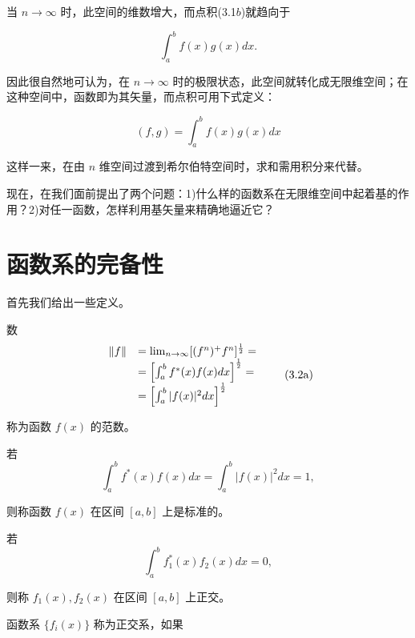 当 $n \to \infty$ 时，此空间的维数增大，而点积(3.1$b$)就趋向于

\begin{equation*}
\int_ {a} ^ {b} f (x) g (x) d x.
\end{equation*}

因此很自然地可认为，在 $n \to \infty$ 时的极限状态，此空间就转化成无限维空间；在这种空间中，函数即为其矢量，而点积可用下式定义：

\begin{equation*}
(f, g) = \int_ {a} ^ {b} f (x) g (x) d x\tag{3.1c}
\end{equation*}

这样一来，在由 $n$ 维空间过渡到希尔伯特空间时，求和需用积分来代替。

现在，在我们面前提出了两个问题：1)什么样的函数系在无限维空间中起着基的作用？2)对任一函数，怎样利用基矢量来精确地逼近它？

\section{函数系的完备性}

首先我们给出一些定义。

数
\begin{equation*}
\begin{array}{r l}\| f \|&= \lim _ {n \rightarrow \infty} [ (f ^ {n}) ^ {+} f ^ {n} ] ^ {\frac {1}{2}} =\\&= \left[ \int_ {a} ^ {b} f ^ {*} (x) f (x) d x \right] ^ {\frac {1}{2}} =\\&= \left[ \int_ {a} ^ {b} | f (x) | ^ {2} d x \right] ^ {\frac {1}{2}}\end{array}\tag{3.2a}
\end{equation*}

称为函数 $f(x)$ 的范数。

若
\begin{equation*}
\int_ {a} ^ {b} f ^ {*} (x) f (x) d x = \int_ {a} ^ {b} | f (x) | ^ {2} d x = 1,\tag{3.2b}
\end{equation*}

则称函数 $f(x)$ 在区间 $[a, b]$ 上是标准的。

若
\begin{equation*}
\int_ {a} ^ {b} f _ {1} ^ {*} (x) f _ {2} (x) d x = 0,\tag{3.2c}
\end{equation*}

则称 $f_{1}(x), f_{2}(x)$ 在区间 $[a, b]$ 上正交。

函数系 $\{f_{i}(x)\}$ 称为正交系，如果

